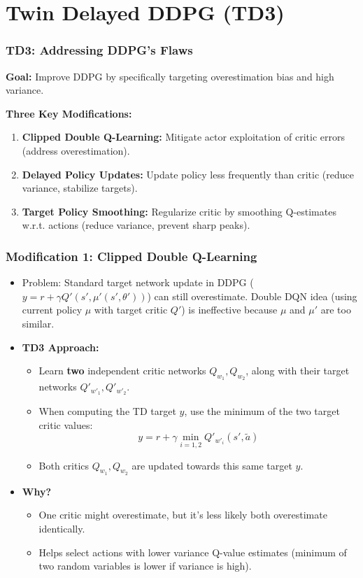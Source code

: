 \documentclass[9pt, aspectratio=169]{beamer}
\newcommand{\pageauthor}{}
\begin{document}
\section{Twin Delayed DDPG (TD3)}
\renewcommand{\pageauthor}{Vikaskumar Kalsariya}

\begin{frame}
  \frametitle{TD3: Addressing DDPG's Flaws}
    \textbf{Goal:} Improve DDPG by specifically targeting overestimation bias and high variance.

    \textbf{Three Key Modifications:}
    \begin{enumerate}
        \item \textbf{Clipped Double Q-Learning:} Mitigate actor exploitation of critic errors (address overestimation).
        \item \textbf{Delayed Policy Updates:} Update policy less frequently than critic (reduce variance, stabilize targets).
        \item \textbf{Target Policy Smoothing:} Regularize critic by smoothing Q-estimates w.r.t. actions (reduce variance, prevent sharp peaks).
    \end{enumerate}
\end{frame}

\begin{frame}
  \frametitle{Modification 1: Clipped Double Q-Learning}
    \begin{itemize}
        \item Problem: Standard target network update in DDPG ($y = r + \gamma Q'(s', \mu'(s', \theta'))$) can still overestimate. Double DQN idea (using current policy $\mu$ with target critic $Q'$) is ineffective because $\mu$ and $\mu'$ are too similar.
        \item \textbf{TD3 Approach:}
        \begin{itemize}
            \item Learn \textbf{two} independent critic networks $Q_{w_1}, Q_{w_2}$, along with their target networks $Q'_{w'_1}, Q'_{w'_2}$.
            \item When computing the TD target $y$, use the minimum of the two target critic values:
            \begin{equation*}
            y = r + \gamma \min_{i=1,2} Q'_{w'_i}(s', \tilde{a})
            \end{equation*}
            \item Both critics $Q_{w_1}, Q_{w_2}$ are updated towards this same target $y$.
        \end{itemize}
        \item \textbf{Why?}
        \begin{itemize}
            \item One critic might overestimate, but it's less likely both overestimate identically.
            \item Helps select actions with lower variance Q-value estimates (minimum of two random variables is lower if variance is high).
        \end{itemize}
    \end{itemize}
\end{frame}
\end{document}
